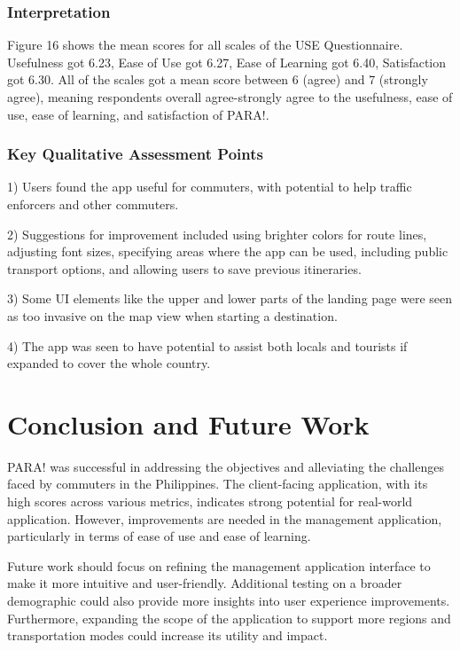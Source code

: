\documentclass[journal]{./IEEE/IEEEtran}
\begin{document}
\subsubsection{Interpretation}
Figure 16 shows the mean scores for all scales of the USE Questionnaire. Usefulness got 6.23, Ease of Use got 6.27, Ease of Learning got 6.40, Satisfaction got 6.30.
All of the scales got a mean score between 6 (agree) and 7 (strongly agree), meaning respondents overall agree-strongly agree to the usefulness, ease of use, ease of learning, and satisfaction of PARA!.
\subsubsection{Key Qualitative Assessment Points}
\begin{description}
    \item 1) Users found the app useful for commuters, with potential to help traffic enforcers and other commuters.
    \item 2) Suggestions for improvement included using brighter colors for route lines, adjusting font sizes, specifying areas where the app can be used, including public transport options, and allowing users to save previous itineraries.
    \item 3) Some UI elements like the upper and lower parts of the landing page were seen as too invasive on the map view when starting a destination.
    \item 4) The app was seen to have potential to assist both locals and tourists if expanded to cover the whole country.
\end{description}
\section{Conclusion and Future Work}
PARA! was successful in addressing the objectives and alleviating the challenges faced by commuters in the Philippines. The client-facing application, with its high scores across various metrics, indicates strong potential for real-world application. However, improvements are needed in the management application, particularly in terms of ease of use and ease of learning.

Future work should focus on refining the management application interface to make it more intuitive and user-friendly. Additional testing on a broader demographic could also provide more insights into user experience improvements. Furthermore, expanding the scope of the application to support more regions and transportation modes could increase its utility and impact.
\end{document}
